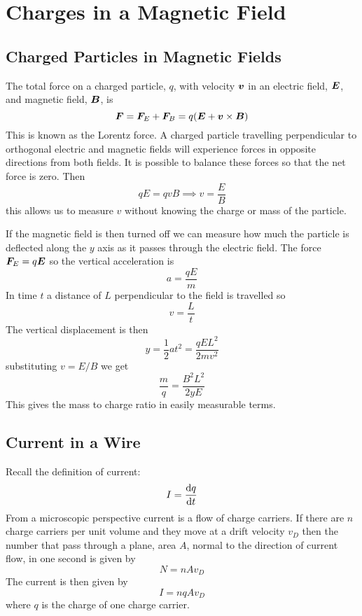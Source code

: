 \documentclass{article}
\begin{document}
    \section{Charges in a Magnetic Field}
    \subsection{Charged Particles in Magnetic Fields}
    The total force on a charged particle, \(q\), with velocity \(\bm{v}\) in an electric field, \(\bm{E}\), and magnetic field, \(\bm{B}\), is
    \[\bm{F} = \bm{F}_E + \bm{F}_B = q(\bm{E} + \bm{v}\times\bm{B})\]
    This is known as the Lorentz force.
    A charged particle travelling perpendicular to orthogonal electric and magnetic fields will experience forces in opposite directions from both fields.
    It is possible to balance these forces so that the net force is zero.
    Then
    \[qE = qvB \implies v = \frac{E}{B}\]
    this allows us to measure \(v\) without knowing the charge or mass of the particle.
    
    If the magnetic field is then turned off we can measure how much the particle is deflected along the \(y\) axis as it passes through the electric field.
    The force \(\bm{F}_E = q\bm{E}\) so the vertical acceleration is
    \[a = \frac{qE}{m}\]
    In time \(t\) a distance of \(L\) perpendicular to the field is travelled so
    \[v = \frac{L}{t}\]
    The vertical displacement is then
    \[y = \frac{1}{2}at^2 = \frac{qEL^2}{2mv^2}\]
    substituting \(v = E/B\) we get
    \[\frac{m}{q} = \frac{B^2L^2}{2yE}\]
    This gives the mass to charge ratio in easily measurable terms.
    
    \subsection{Current in a Wire}
    Recall the definition of current:
    \[I = \dv{q}{t}\]
    From a microscopic perspective current is a flow of charge carriers.
    If there are \(n\) charge carriers per unit volume and they move at a drift velocity \(v_D\) then the number that pass through a plane, area \(A\), normal to the direction of current flow, in one second is given by
    \[N = nAv_D\]
    The current is then given by
    \[I = nqAv_D\]
    where \(q\) is the charge of one charge carrier.
    
\end{document}
